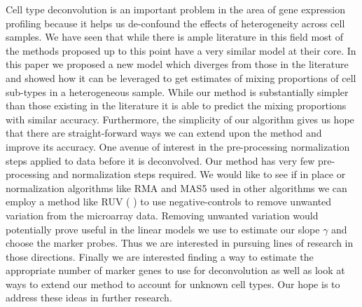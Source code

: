 \documentclass[reqno,12pt,oneside]{report}\usepackage[]{graphicx}\usepackage[]{color}
\renewcommand{\citet}[1]{(\citeauthor{#1} \citeyear{#1})}
\theoremstyle{plain}
\theoremstyle{definition}
\theoremstyle{remark}
\numberwithin{theorem}{chapter}     %
\begin{document}
Cell type deconvolution is an important problem in the area of gene expression profiling because it helps us de-confound the effects of heterogeneity across cell samples. We have seen that while there is ample literature in this field most of the methods proposed up to this point have a very similar model at their core. In this paper we proposed a new model which diverges from those in the literature and showed how it can be leveraged to get estimates of mixing proportions of cell sub-types in a heterogeneous sample. While our method is substantially simpler than those existing in the literature it is able to predict the mixing proportions with similar accuracy. Furthermore, the simplicity of our algorithm gives us hope that there are straight-forward ways we can extend upon the method and improve its accuracy. One avenue of interest in the pre-processing normalization steps applied to data before it is deconvolved. Our method has very few pre-processing and normalization steps required. We would like to see if in place or normalization algorithms like RMA and MAS5 used in other algorithms we can employ a method like RUV \citet{Gagnon-Bartsch2012} to use negative-controls to remove unwanted variation from the microarray data. Removing unwanted variation would potentially prove useful in the linear models we use to estimate our slope $\gamma$ and choose the marker probes. Thus we are interested in pursuing lines of research in those directions. Finally we are interested finding a way to estimate the appropriate number of marker genes to use for deconvolution as well as look at ways to extend our method to account for unknown cell types. Our hope is to address these ideas in further research. 
 

\renewcommand{\bibsection}{}
\startbibliography
 \begin{singlespace} %
  
 \end{singlespace}
 
\startappendices
{}
\end{document}
